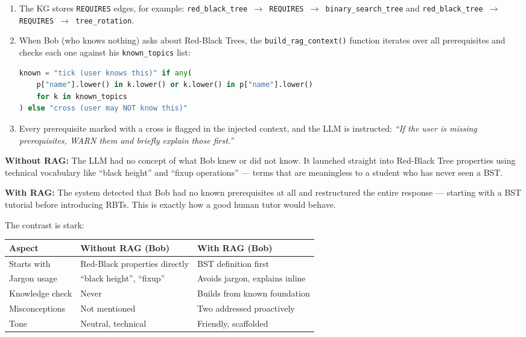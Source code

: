 \documentclass[12pt,a4paper]{article}
\begin{document}
\begin{enumerate}
  \item The KG stores \texttt{REQUIRES} edges, for example:
    \texttt{red\_black\_tree $\to$ REQUIRES $\to$ binary\_search\_tree} and
    \texttt{red\_black\_tree $\to$ REQUIRES $\to$ tree\_rotation}.

  \item When Bob (who knows nothing) asks about Red-Black Trees, the
    \texttt{build\_rag\_context()} function iterates over all prerequisites and
    checks each one against his \texttt{known\_topics} list:

\begin{lstlisting}[language=Python]
known = "tick (user knows this)" if any(
    p["name"].lower() in k.lower() or k.lower() in p["name"].lower()
    for k in known_topics
) else "cross (user may NOT know this)"
\end{lstlisting}

  \item Every prerequisite marked with a cross is flagged in the injected
    context, and the LLM is instructed: \textit{``If the user is missing
    prerequisites, WARN them and briefly explain those first.''}
\end{enumerate}

\textbf{Without RAG:} The LLM had no concept of what Bob knew or did not know.
It launched straight into Red-Black Tree properties using technical vocabulary
like ``black height'' and ``fixup operations'' --- terms that are meaningless to
a student who has never seen a BST.

\textbf{With RAG:} The system detected that Bob had no known prerequisites at
all and restructured the entire response --- starting with a BST tutorial before
introducing RBTs. This is exactly how a good human tutor would behave.

The contrast is stark:

\begin{center}
\begin{tabularx}{\textwidth}{lXX}
  \toprule
  \textbf{Aspect} & \textbf{Without RAG (Bob)} & \textbf{With RAG (Bob)} \\
  \midrule
  Starts with     & Red-Black properties directly & BST definition first \\
  Jargon usage    & ``black height'', ``fixup''   & Avoids jargon, explains inline \\
  Knowledge check & Never                         & Builds from known foundation \\
  Misconceptions  & Not mentioned                 & Two addressed proactively \\
  Tone            & Neutral, technical            & Friendly, scaffolded \\
  \bottomrule
\end{tabularx}
\end{center}
\end{document}
